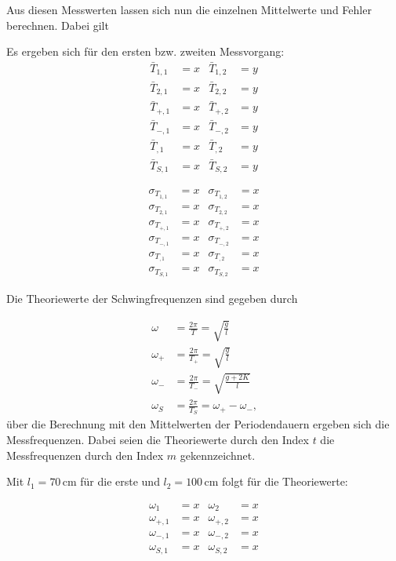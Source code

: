 Aus diesen Messwerten lassen sich nun die einzelnen Mittelwerte und Fehler berechnen. Dabei gilt


\newpage

Es ergeben sich für den ersten bzw. zweiten Messvorgang:
\begin{align}
  \bar{T}_{1,1} & = x  & \bar{T}_{1,2} & = y \\
  \bar{T}_{2,1} & = x  & \bar{T}_{2,2} & = y \\ 
  \bar{T}_{+,1} & = x  & \bar{T}_{+,2} & = y \\
  \bar{T}_{-,1} & = x  & \bar{T}_{-,2} & = y \\
  \bar{T}_{,1}  & = x  & \bar{T}_{,2}  & = y \\
  \bar{T}_{S,1} & = x  & \bar{T}_{S,2} & = y 
\end{align}


\begin{align}
  σ_{T_{1,1}} & = x & σ_{T_{1,2}} & = x \\
  σ_{T_{2,1}} & = x & σ_{T_{2,2}} & = x \\
  σ_{T_{+,1}} & = x & σ_{T_{+,2}} & = x \\
  σ_{T_{-,1}} & = x & σ_{T_{-,2}} & = x \\
  σ_{T_{,1}} & = x & σ_{T_{,2}} & = x \\
  σ_{T_{S,1}} & = x & σ_{T_{S,2}} & = x 
\end{align}

Die Theoriewerte der Schwingfrequenzen sind gegeben durch

\begin{align}
  \omega   & = \frac{2π}{T}     =   \sqrt{\frac{g}{l}} \\
  \omega_+ & = \frac{2π}{T_+} =   \sqrt{\frac{g}{l}} \\
  \omega_- & = \frac{2π}{T_-} =\sqrt{\frac{g+2K}{l}} \\
  \omega_S & = \frac{2π}{T_S} =  \omega_+ -\omega_- \text{,}
\end{align}
über die Berechnung mit den Mittelwerten der Periodendauern ergeben sich die Messfrequenzen. Dabei seien die Theoriewerte durch den Index $t$
die Messfrequenzen durch den Index $m$ gekennzeichnet.

Mit $l_1=70 \, \unit{\centi\meter}$ für die erste und $l_2= 100 \, \unit{\centi\meter}$ folgt für die Theoriewerte:

\begin{align}
\omega_1 & = x & \omega_2 & = x \\
\omega_{+,1} & = x & \omega_{+,2} & = x \\
\omega_{-,1} & = x & \omega_{-,2} & = x \\
\omega_{S,1} & = x & \omega_{S,2} & = x 
\end{align}

